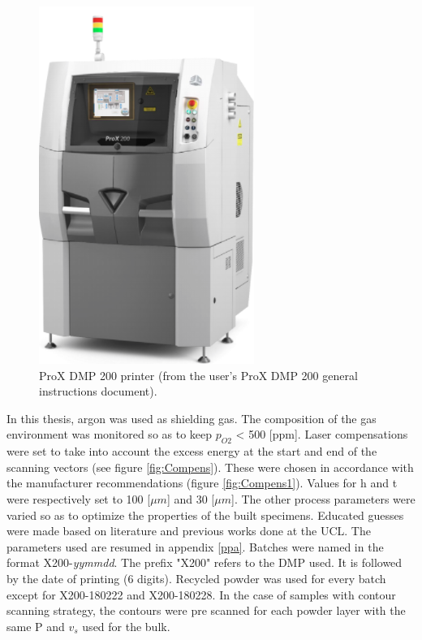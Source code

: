 \begin{figure}[ht]
\centering
\includegraphics[scale=0.7]{Images/Printer}
\decoRule
\caption[ProX DMP 200 printer]{ProX DMP 200 printer (from the user's ProX DMP 200 general instructions document).}
\label{fig:Printer}
\end{figure}

In this thesis, argon was used as shielding gas. The composition of the gas environment was monitored so as to keep $p_{O2}$ < 500 [ppm]. Laser compensations were set to take into account the excess energy at the start and end of the scanning vectors (see figure \ref{fig:Compens}). These were chosen in accordance with the manufacturer recommendations (figure \ref{fig:Compens1}). Values for h and t were respectively set to 100 [$\mu m$] and 30 [$\mu m$]. The other process parameters were varied so as to optimize the properties of the built specimens. Educated guesses were made based on literature and previous works done at the UCL. The parameters used are resumed in appendix \ref{ppa}. Batches were named in the format X200-\textit{yymmdd}. The prefix "X200" refers to the DMP used. It is followed by the date of printing (6 digits). Recycled powder was used for every batch except for X200-180222 and X200-180228. In the case of samples with contour scanning strategy, the contours were pre scanned for each powder layer with the same P and $v_s$ used for the bulk. \\


